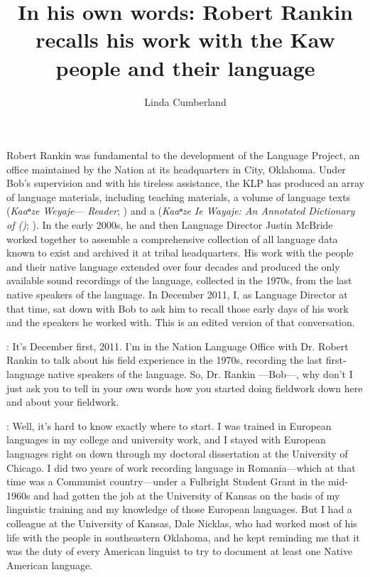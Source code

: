 \documentclass[output=paper]{LSP/langsci}
\author{Linda Cumberland}
\title{In his own words: {Robert Rankin} recalls his work with the {Kaw} people and their language}
\begin{document}
Robert Rankin was fundamental to the development of the  Language Project, an office maintained by the  Nation at its headquarters in  City, Oklahoma. Under Bob's supervision and with his tireless assistance, the KLP has produced an array of language materials, including teaching materials, a volume of  language texts (\textit{Kaaⁿze Weyaje}---\textit{ Reader}; \citealt{KanzaLP2010}) and a  (\textit{Kaaⁿze Ie Wayaje: An Annotated Dictionary of  ()}; \citealt{CumberlandRankin2012}). In the early 2000s, he and then Language Director Justin McBride worked together to assemble a comprehensive collection of all  language data known to exist and archived it at tribal headquarters. His work with the  people and their native language extended over four decades and produced the only available sound recordings of the language, collected in the 1970s, from the last native speakers of the language. In December 2011, I, as Language Director at that time, sat down with Bob to ask him to recall those early days of his work and the speakers he worked with. This is an edited version of that conversation.

: It's December first, 2011. I'm in the  Nation Language Office with Dr. Robert Rankin to talk about his field experience in the 1970s, recording the last first-language native speakers of the  language. So, Dr. Rankin ---Bob---, why don't I just ask you to tell in your own words how you started doing fieldwork down here and about your fieldwork. 

:  Well, it's hard to know exactly where to start. I was trained in European languages in my college and university work, and I stayed with European languages right on down through my doctoral dissertation at the University of Chicago. I did two years of work recording  language  in Romania---which at that time was a Communist country---under a Fulbright Student Grant in the mid-1960s and had gotten the job at the University of Kansas on the basis of my linguistic training and my knowledge of those European languages. But I had a colleague at the University of Kansas, Dale Nicklas, who had worked most of his life with the  people in southeastern Oklahoma, and he kept reminding me that it was the duty of every American linguist to try to document at least one Native American language. 
\end{document}
